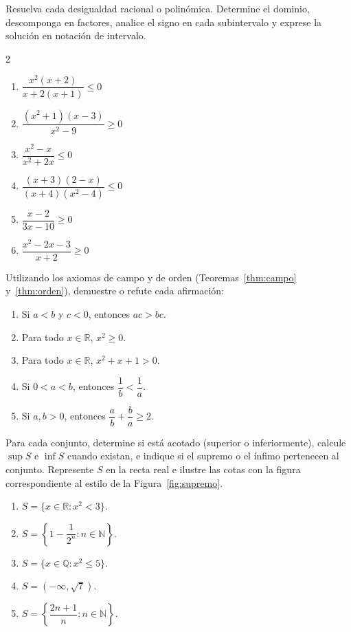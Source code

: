 \begin{prob}
Resuelva cada desigualdad racional o polinómica. Determine el dominio,
descomponga en factores, analice el signo en cada subintervalo y exprese la
solución en notación de intervalo.

\begin{multicols}{2}
\begin{enumerate}
   \item $\dfrac{x^2(x+2)}{x+2(x+1)} \leq 0$
   \item $\dfrac{(x^2+1)(x-3)}{x^2-9} \geq 0$
   \item $\dfrac{x^2-x}{x^2+2x} \leq 0$
   \item $\dfrac{(x+3)(2-x)}{(x+4)(x^2-4)} \leq 0$
   \item $\dfrac{x-2}{3x-10} \geq 0$
   \item $\dfrac{x^2-2x-3}{x+2} \geq 0$
\end{enumerate}
\end{multicols}
\end{prob}

\begin{prob}
Utilizando los axiomas de campo y de orden (Teoremas~\ref{thm:campo}
y~\ref{thm:orden}), demuestre o refute cada afirmación:
\begin{enumerate}
   \item Si $a < b$ y $c < 0$, entonces $ac > bc$.
   \item Para todo $x \in \mathbb{R}$, $x^2 \geq 0$.
   \item Para todo $x \in \mathbb{R}$, $x^2 + x + 1 > 0$.
   \item Si $0 < a < b$, entonces $\dfrac{1}{b} < \dfrac{1}{a}$.
   \item Si $a, b > 0$, entonces $\dfrac{a}{b} + \dfrac{b}{a} \geq 2$.
\end{enumerate}
\end{prob}

\begin{prob}
Para cada conjunto, determine si está acotado (superior o inferiormente),
calcule $\sup S$ e $\inf S$ cuando existan, e indique si el supremo o el
ínfimo pertenecen al conjunto. Represente $S$ en la recta real e ilustre las
cotas con la figura correspondiente al estilo de la Figura~\ref{fig:supremo}.

\begin{enumerate}
   \item $S = \{x \in \mathbb{R} : x^2 < 3\}$.
   \item $S = \left\{1 - \dfrac{1}{2^n} : n \in \mathbb{N}\right\}$.
   \item $S = \{x \in \mathbb{Q} : x^2 \leq 5\}$.
   \item $S = (-\infty, \sqrt{7})$.
   \item $S = \left\{\dfrac{2n+1}{n} : n \in \mathbb{N}\right\}$.
\end{enumerate}
\end{prob}

